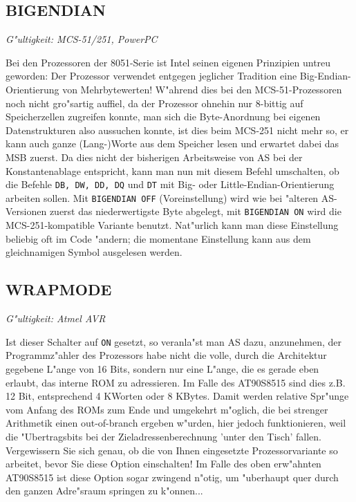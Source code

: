 \documentclass[12pt,a4paper,twoside]{report}
\makeatletter
\newcommand{\tty}[1]{{\tt #1}}
\newcommand{\ttindex}[1]{\index{#1@{\tt #1}}}
\makeatother
\begin{document}

\subsection{BIGENDIAN}
\ttindex{BIGENDIAN}

{\em G"ultigkeit: MCS-51/251, PowerPC}

Bei den Prozessoren der 8051-Serie ist Intel seinen eigenen Prinzipien
untreu geworden: Der Prozessor verwendet entgegen jeglicher Tradition
eine Big-Endian-Orientierung von Mehrbytewerten!  W"ahrend dies bei
den MCS-51-Prozessoren noch nicht gro"sartig auffiel, da der Prozessor
ohnehin nur 8-bittig auf Speicherzellen zugreifen konnte, man sich die
Byte-Anordnung bei eigenen Datenstrukturen also aussuchen konnte, ist
dies beim MCS-251 nicht mehr so, er kann auch ganze (Lang-)Worte aus
dem Speicher lesen und erwartet dabei das MSB zuerst.  Da dies nicht der
bisherigen Arbeitsweise von AS bei der Konstantenablage entspricht,
kann man nun mit diesem Befehl umschalten, ob die Befehle \tty{DB, DW, DD,
DQ} und \tty{DT} mit Big- oder Little-Endian-Orientierung arbeiten sollen.
Mit \tty{BIGENDIAN OFF} (Voreinstellung) wird wie bei "alteren AS-Versionen
zuerst das niederwertigste Byte abgelegt, mit \tty{BIGENDIAN ON} wird die
MCS-251-kompatible Variante benutzt.  Nat"urlich kann man diese Einstellung
beliebig oft im Code "andern; die momentane Einstellung kann aus dem
gleichnamigen Symbol ausgelesen werden.


\subsection{WRAPMODE}
\ttindex{WRAPMODE}

{\em G"ultigkeit: Atmel AVR}

Ist dieser Schalter auf {\tt ON} gesetzt, so veranla"st man AS dazu,
anzunehmen, der Programmz"ahler des Prozessors habe nicht die volle, durch
die Architektur gegebene L"ange von 16 Bits, sondern nur eine L"ange, die
es gerade eben erlaubt, das interne ROM zu adressieren.  Im Falle des
AT90S8515 sind dies z.B. 12 Bit, entsprechend 4 KWorten oder 8 KBytes.
Damit werden relative Spr"unge vom Anfang des ROMs zum Ende und umgekehrt
m"oglich, die bei strenger Arithmetik einen out-of-branch ergeben w"urden,
hier jedoch funktionieren, weil die "Ubertragsbits bei der
Zieladressenberechnung 'unter den Tisch' fallen.  Vergewissern Sie sich
genau, ob die von Ihnen eingesetzte Prozessorvariante so arbeitet, bevor
Sie diese Option einschalten!  Im Falle des oben erw"ahnten AT90S8515 ist
diese Option sogar zwingend n"otig, um "uberhaupt quer durch den ganzen
Adre"sraum springen zu k"onnen...
\end{document}
